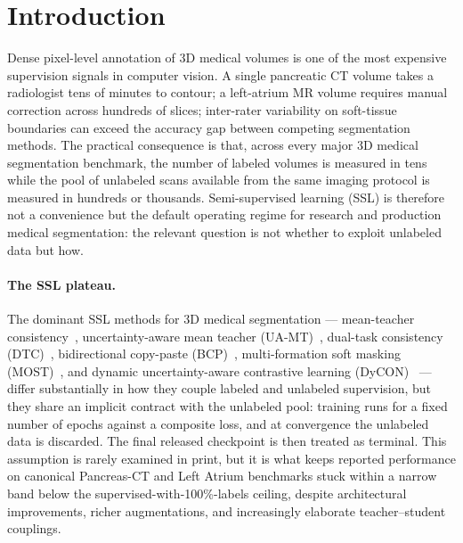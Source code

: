\section{Introduction}
\label{sec:intro}

Dense pixel-level annotation of 3D medical volumes is one of the most expensive supervision signals in computer vision. A single pancreatic CT volume takes a radiologist tens of minutes to contour; a left-atrium MR volume requires manual correction across hundreds of slices; inter-rater variability on soft-tissue boundaries can exceed the accuracy gap between competing segmentation methods. The practical consequence is that, across every major 3D medical segmentation benchmark, the number of labeled volumes is measured in tens while the pool of unlabeled scans available from the same imaging protocol is measured in hundreds or thousands. Semi-supervised learning (SSL) is therefore not a convenience but the default operating regime for research and production medical segmentation: the relevant question is not whether to exploit unlabeled data but how.

\paragraph{The SSL plateau.}
The dominant SSL methods for 3D medical segmentation --- mean-teacher consistency~\cite{tarvainen2017meanteacher}, uncertainty-aware mean teacher (UA-MT)~\cite{yu2019uamt}, dual-task consistency (DTC)~\cite{luo2022dtc}, bidirectional copy-paste (BCP)~\cite{bai2023bcp}, multi-formation soft masking (MOST)~\cite{liu2024most}, and dynamic uncertainty-aware contrastive learning (DyCON)~\cite{assefa2025dycon} --- differ substantially in how they couple labeled and unlabeled supervision, but they share an implicit contract with the unlabeled pool: training runs for a fixed number of epochs against a composite loss, and at convergence the unlabeled data is discarded. The final released checkpoint is then treated as terminal. This assumption is rarely examined in print, but it is what keeps reported performance on canonical Pancreas-CT and Left Atrium benchmarks stuck within a narrow band below the supervised-with-100\%-labels ceiling, despite architectural improvements, richer augmentations, and increasingly elaborate teacher--student couplings.

